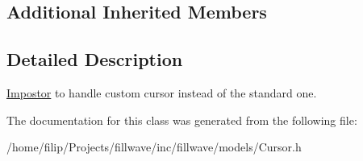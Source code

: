 \subsection*{Additional Inherited Members}


\subsection{Detailed Description}
\hyperlink{classflw_1_1flf_1_1Impostor}{Impostor} to handle custom cursor instead of the standard one. 

The documentation for this class was generated from the following file\+:\begin{DoxyCompactItemize}
\item 
/home/filip/\+Projects/fillwave/inc/fillwave/models/Cursor.\+h\end{DoxyCompactItemize}

